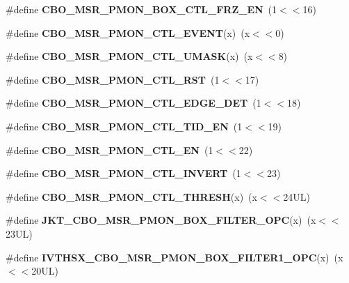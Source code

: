 \begin{DoxyCompactItemize}
\item 
\#define {\bfseries C\+B\+O\+\_\+\+M\+S\+R\+\_\+\+P\+M\+O\+N\+\_\+\+B\+O\+X\+\_\+\+C\+T\+L\+\_\+\+F\+R\+Z\+\_\+\+E\+N}~(1$<$$<$16)\label{types_8h_ad8316e258d2a51d1aad00cf6c20ad88e}

\item 
\#define {\bfseries C\+B\+O\+\_\+\+M\+S\+R\+\_\+\+P\+M\+O\+N\+\_\+\+C\+T\+L\+\_\+\+E\+V\+E\+N\+T}(x)~(x$<$$<$0)\label{types_8h_ac572d0ab73f1d5516b008b15d3bec94c}

\item 
\#define {\bfseries C\+B\+O\+\_\+\+M\+S\+R\+\_\+\+P\+M\+O\+N\+\_\+\+C\+T\+L\+\_\+\+U\+M\+A\+S\+K}(x)~(x$<$$<$8)\label{types_8h_add8dafef2e53ac0976ab2b8c79eca357}

\item 
\#define {\bfseries C\+B\+O\+\_\+\+M\+S\+R\+\_\+\+P\+M\+O\+N\+\_\+\+C\+T\+L\+\_\+\+R\+S\+T}~(1$<$$<$17)\label{types_8h_a0d052a712eaf558986bbc05261824889}

\item 
\#define {\bfseries C\+B\+O\+\_\+\+M\+S\+R\+\_\+\+P\+M\+O\+N\+\_\+\+C\+T\+L\+\_\+\+E\+D\+G\+E\+\_\+\+D\+E\+T}~(1$<$$<$18)\label{types_8h_aa1e7dd3fb15ea04620a9d20a68b283a3}

\item 
\#define {\bfseries C\+B\+O\+\_\+\+M\+S\+R\+\_\+\+P\+M\+O\+N\+\_\+\+C\+T\+L\+\_\+\+T\+I\+D\+\_\+\+E\+N}~(1$<$$<$19)\label{types_8h_ac8a367544d2f6c270199a2dad381c10a}

\item 
\#define {\bfseries C\+B\+O\+\_\+\+M\+S\+R\+\_\+\+P\+M\+O\+N\+\_\+\+C\+T\+L\+\_\+\+E\+N}~(1$<$$<$22)\label{types_8h_a624d2a2eee41bf4f9ed3b7e50ed7de9d}

\item 
\#define {\bfseries C\+B\+O\+\_\+\+M\+S\+R\+\_\+\+P\+M\+O\+N\+\_\+\+C\+T\+L\+\_\+\+I\+N\+V\+E\+R\+T}~(1$<$$<$23)\label{types_8h_ae080b2e88b364739256198f9fc6ef8f4}

\item 
\#define {\bfseries C\+B\+O\+\_\+\+M\+S\+R\+\_\+\+P\+M\+O\+N\+\_\+\+C\+T\+L\+\_\+\+T\+H\+R\+E\+S\+H}(x)~(x$<$$<$24\+U\+L)\label{types_8h_aedec93a7fe3b48c66ae3c5d49232aef1}

\item 
\#define {\bfseries J\+K\+T\+\_\+\+C\+B\+O\+\_\+\+M\+S\+R\+\_\+\+P\+M\+O\+N\+\_\+\+B\+O\+X\+\_\+\+F\+I\+L\+T\+E\+R\+\_\+\+O\+P\+C}(x)~(x$<$$<$23\+U\+L)\label{types_8h_a72146a3beff41b1742b661879850a483}

\item 
\#define {\bfseries I\+V\+T\+H\+S\+X\+\_\+\+C\+B\+O\+\_\+\+M\+S\+R\+\_\+\+P\+M\+O\+N\+\_\+\+B\+O\+X\+\_\+\+F\+I\+L\+T\+E\+R1\+\_\+\+O\+P\+C}(x)~(x$<$$<$20\+U\+L)\label{types_8h_a3a2aaf9fb5d886edcdb6ffc9194eed74}


\end{DoxyCompactItemize}
